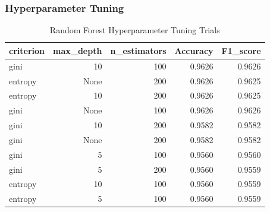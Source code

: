 \documentclass[12pt]{article}
\begin{document}
\subsubsection*{Hyperparameter Tuning }
\begin{table}[H]
    \centering
    \caption{Random Forest Hyperparameter Tuning Trials}
    \label{tab:rf_trials} 
    \begin{tabular}{lrrrr}
        \toprule
        \textbf{criterion} & \textbf{max\_depth} & \textbf{n\_estimators} & \textbf{Accuracy} & \textbf{F1\_score} \\
        \midrule
        gini    & 10   & 100 & 0.9626 & 0.9626 \\
        entropy & None & 200 & 0.9626 & 0.9625 \\
        entropy & 10   & 200 & 0.9626 & 0.9625 \\
        gini    & None & 100 & 0.9626 & 0.9626 \\
        gini    & 10   & 200 & 0.9582 & 0.9582 \\
        gini    & None & 200 & 0.9582 & 0.9582 \\
        gini    & 5    & 100 & 0.9560 & 0.9560 \\
        gini    & 5    & 200 & 0.9560 & 0.9559 \\
        entropy & 10   & 100 & 0.9560 & 0.9559 \\
        entropy & 5    & 100 & 0.9560 & 0.9559 \\
        \bottomrule
    \end{tabular}
\end{table}
\end{document}
